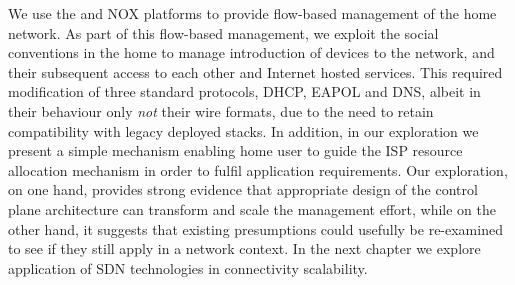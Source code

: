 We use the \ovs and NOX platforms to provide flow-based management of the home
network.  As part of this flow-based management, we exploit the social
conventions in the home to manage introduction of devices  to the network, and
their subsequent access to each other and Internet hosted services.  This
required modification of three standard protocols, DHCP, EAPOL and DNS, albeit
in their behaviour only \emph{not} their wire formats, due to the need to retain
compatibility with legacy deployed stacks. In addition, in our exploration we
present a simple mechanism enabling home user to guide the ISP resource
allocation mechanism in order to fulfil application requirements.  Our
exploration, on one hand, provides strong evidence that appropriate design of
the control plane architecture can transform and scale the management effort,
while on the other hand, it suggests that existing presumptions could usefully
be re-examined to see if they still apply in a network context.  In the next
chapter we explore application of SDN technologies in connectivity scalability. 

